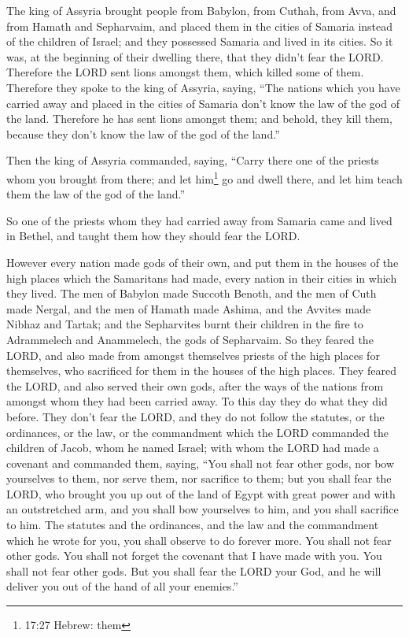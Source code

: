  The king of Assyria brought people from Babylon, from
Cuthah, from Avva, and from Hamath and Sepharvaim, and placed them in
the cities of Samaria instead of the children of Israel; and they
possessed Samaria and lived in its cities.  So it was, at
the beginning of their dwelling there, that they didn't fear the LORD.
Therefore the LORD sent lions amongst them, which killed some of them.
 Therefore they spoke to the king of Assyria, saying, ``The
nations which you have carried away and placed in the cities of Samaria
don't know the law of the god of the land. Therefore he has sent lions
amongst them; and behold, they kill them, because they don't know the
law of the god of the land.''

 Then the king of Assyria commanded, saying, ``Carry there
one of the priests whom you brought from there; and let him\footnote{17:27
  Hebrew: them} go and dwell there, and let him teach them the law of
the god of the land.''

 So one of the priests whom they had carried away from
Samaria came and lived in Bethel, and taught them how they should fear
the LORD.

 However every nation made gods of their own, and put them
in the houses of the high places which the Samaritans had made, every
nation in their cities in which they lived.  The men of
Babylon made Succoth Benoth, and the men of Cuth made Nergal, and the
men of Hamath made Ashima,  and the Avvites made Nibhaz and
Tartak; and the Sepharvites burnt their children in the fire to
Adrammelech and Anammelech, the gods of Sepharvaim.  So
they feared the LORD, and also made from amongst themselves priests of
the high places for themselves, who sacrificed for them in the houses of
the high places.  They feared the LORD, and also served
their own gods, after the ways of the nations from amongst whom they had
been carried away.  To this day they do what they did
before. They don't fear the LORD, and they do not follow the statutes,
or the ordinances, or the law, or the commandment which the LORD
commanded the children of Jacob, whom he named Israel; 
with whom the LORD had made a covenant and commanded them, saying, ``You
shall not fear other gods, nor bow yourselves to them, nor serve them,
nor sacrifice to them;  but you shall fear the LORD, who
brought you up out of the land of Egypt with great power and with an
outstretched arm, and you shall bow yourselves to him, and you shall
sacrifice to him.  The statutes and the ordinances, and the
law and the commandment which he wrote for you, you shall observe to do
forever more. You shall not fear other gods.  You shall not
forget the covenant that I have made with you. You shall not fear other
gods.  But you shall fear the LORD your God, and he will
deliver you out of the hand of all your enemies.''

